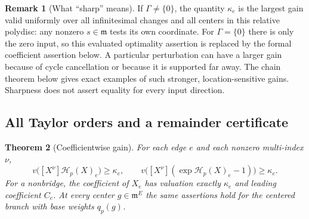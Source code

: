 \documentclass[11pt,a4paper]{article}
\numberwithin{equation}{section}
\newtheorem{theorem}{Theorem}[section]
\theoremstyle{definition}
\newtheorem{remark}[theorem]{Remark}
\newcommand{\mm}{\mathfrak m}
\begin{document}
\begin{remark}[What ``sharp'' means]
If $\Gamma\ne\{0\}$, the quantity $\kappa_e$ is the largest gain
valid uniformly over all infinitesimal changes and all centers in this
relative polydisc: any nonzero $s\in\mm$ tests its own coordinate.
For $\Gamma=\{0\}$ there is only the zero input, so this evaluated
optimality assertion is replaced by the formal coefficient assertion below.
A particular perturbation can have a larger gain because of cycle
cancellation or because it is supported far away. The chain theorem
below gives exact examples of such stronger, location-sensitive gains.
Sharpness does not assert equality for every input direction.
\end{remark}

\subsection{All Taylor orders and a remainder certificate}
\begin{theorem}[Coefficientwise gain]\label{scale:thm:coeffgain}
For each edge $e$ and each nonzero multi-index $\nu$,
\begin{equation}\label{scale:eq:coefficientbound}
 v\bigl([X^\nu]\mathcal H_p(X)_e\bigr)\geq\kappa_e,
 \qquad
 v\bigl([X^\nu](\exp\mathcal H_p(X)_e-1)\bigr)\geq\kappa_e.
\end{equation}
For a nonbridge, the coefficient of $X_e$ has valuation exactly
$\kappa_e$ and leading coefficient $C_e$. At every center $g\in\mm^E$
the same assertions hold for the centered branch with base weights
$q_p(g)$.
\end{theorem}
\end{document}
